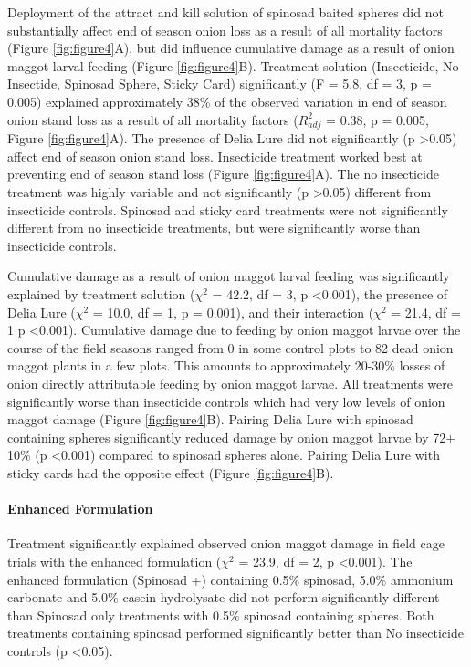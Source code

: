 \documentclass[alpha-refs]{wiley-article}
\begin{document}
Deployment of the attract and kill solution of spinosad baited spheres did not substantially affect end of season onion loss as a result of all mortality factors (Figure \ref{fig:figure4}A), but did influence cumulative damage as a result of onion maggot larval feeding (Figure \ref{fig:figure4}B).  Treatment solution (Insecticide, No Insectide, Spinosad Sphere, Sticky Card) significantly (F = 5.8, df = 3, p = 0.005) explained approximately 38\% of the observed variation in end of season onion stand loss as a result of all mortality factors ($R^2_{adj}$ = 0.38, p = 0.005, Figure \ref{fig:figure4}A).  The presence of Delia Lure did not significantly (p \textgreater 0.05) affect end of season onion stand loss.  Insecticide treatment worked best at preventing end of season stand loss (Figure \ref{fig:figure4}A).  The no insecticide treatment was highly variable and not significantly (p \textgreater 0.05)  different from insecticide controls.  Spinosad and sticky card treatments were not significantly different from no insecticide treatments, but were significantly worse than insecticide controls. 

Cumulative damage as a result of onion maggot larval feeding was significantly explained by treatment solution ($\chi^2$ = 42.2, df = 3, p \textless 0.001), the presence of Delia Lure ($\chi^2$ = 10.0, df = 1, p = 0.001), and their interaction ($\chi^2$ = 21.4, df = 1 p \textless 0.001).  Cumulative damage due to feeding by onion maggot larvae over the course of the field seasons ranged from 0 in some control plots to 82 dead onion maggot plants in a few plots. This amounts to approximately 20-30\% losses of onion directly attributable feeding by onion maggot larvae.  All treatments were significantly worse than insecticide controls which had very low levels of onion maggot damage (Figure \ref{fig:figure4}B).  Pairing Delia Lure with spinosad containing spheres significantly reduced damage by onion maggot larvae by 72$\pm$10\% (p \textless 0.001) compared to spinosad spheres alone.  Pairing Delia Lure with sticky cards had the opposite effect (Figure \ref{fig:figure4}B).  

\paragraph{Enhanced Formulation}

Treatment significantly explained observed onion maggot damage in field cage trials with the enhanced formulation ($\chi^2$ = 23.9, df = 2, p \textless 0.001).  The enhanced formulation (Spinosad +) containing 0.5\% spinosad, 5.0\% ammonium carbonate and 5.0\% casein hydrolysate did not perform significantly different than Spinosad only treatments with 0.5\% spinosad containing spheres.  Both treatments containing spinosad performed significantly better than No insecticide controls (p \textless 0.05).  
\end{document}
